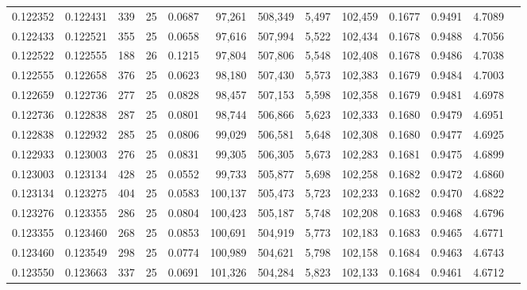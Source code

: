 \begin{tabular}{rrrrrrrrrrrrr}
0.122352 & 0.122431 & 339 &  25 &                                     0.0687 &  97,261 & 508,349 &   5,497 & 102,459 & 0.1677 & 0.9491 & 4.7089 \\
0.122433 & 0.122521 & 355 &  25 &                                     0.0658 &  97,616 & 507,994 &   5,522 & 102,434 & 0.1678 & 0.9488 & 4.7056 \\
0.122522 & 0.122555 & 188 &  26 &                                     0.1215 &  97,804 & 507,806 &   5,548 & 102,408 & 0.1678 & 0.9486 & 4.7038 \\
0.122555 & 0.122658 & 376 &  25 &                                     0.0623 &  98,180 & 507,430 &   5,573 & 102,383 & 0.1679 & 0.9484 & 4.7003 \\
0.122659 & 0.122736 & 277 &  25 &                                     0.0828 &  98,457 & 507,153 &   5,598 & 102,358 & 0.1679 & 0.9481 & 4.6978 \\
0.122736 & 0.122838 & 287 &  25 &                                     0.0801 &  98,744 & 506,866 &   5,623 & 102,333 & 0.1680 & 0.9479 & 4.6951 \\
0.122838 & 0.122932 & 285 &  25 &                                     0.0806 &  99,029 & 506,581 &   5,648 & 102,308 & 0.1680 & 0.9477 & 4.6925 \\
0.122933 & 0.123003 & 276 &  25 &                                     0.0831 &  99,305 & 506,305 &   5,673 & 102,283 & 0.1681 & 0.9475 & 4.6899 \\
0.123003 & 0.123134 & 428 &  25 &                                     0.0552 &  99,733 & 505,877 &   5,698 & 102,258 & 0.1682 & 0.9472 & 4.6860 \\
0.123134 & 0.123275 & 404 &  25 &                                     0.0583 & 100,137 & 505,473 &   5,723 & 102,233 & 0.1682 & 0.9470 & 4.6822 \\
0.123276 & 0.123355 & 286 &  25 &                                     0.0804 & 100,423 & 505,187 &   5,748 & 102,208 & 0.1683 & 0.9468 & 4.6796 \\
0.123355 & 0.123460 & 268 &  25 &                                     0.0853 & 100,691 & 504,919 &   5,773 & 102,183 & 0.1683 & 0.9465 & 4.6771 \\
0.123460 & 0.123549 & 298 &  25 &                                     0.0774 & 100,989 & 504,621 &   5,798 & 102,158 & 0.1684 & 0.9463 & 4.6743 \\
0.123550 & 0.123663 & 337 &  25 &                                     0.0691 & 101,326 & 504,284 &   5,823 & 102,133 & 0.1684 & 0.9461 & 4.6712 \\

\end{tabular}
